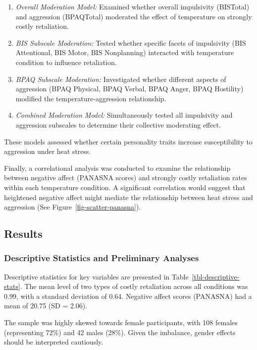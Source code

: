\documentclass[
  man,
  floatsintext,
  longtable,
  nolmodern,
  notxfonts,
  notimes,
  colorlinks=true,linkcolor=blue,citecolor=blue,urlcolor=blue]{apa7}
\providecommand{\tightlist}{%
  \setlength{\itemsep}{0pt}\setlength{\parskip}{0pt}}
\begin{document}
\begin{enumerate}
\def\labelenumi{\arabic{enumi}.}
\tightlist
\item
  \emph{Overall Moderation Model:} Examined whether overall impulsivity
  (BISTotal) and aggression (BPAQTotal) moderated the effect of
  temperature on strongly costly retaliation.
\item
  \emph{BIS Subscale Moderation:} Tested whether specific facets of
  impulsivity (BIS Attentional, BIS Motor, BIS Nonplanning) interacted
  with temperature condition to influence retaliation.
\item
  \emph{BPAQ Subscale Moderation:} Investigated whether different
  aspects of aggression (BPAQ Physical, BPAQ Verbal, BPAQ Anger, BPAQ
  Hostility) modified the temperature-aggression relationship.
\item
  \emph{Combined Moderation Model:} Simultaneously tested all
  impulsivity and aggression subscales to determine their collective
  moderating effect.
\end{enumerate}

These models assessed whether certain personality traits increase
susceptibility to aggression under heat stress.

Finally, a correlational analysis was conducted to examine the
relationship between negative affect (PANASNA scores) and strongly
costly retaliation rates within each temperature condition. A
significant correlation would suggest that heightened negative affect
might mediate the relationship between heat stress and aggression (See
Figure~\ref{fig-scatter-panasna}).

\subsection{Results}\label{results}

\subsubsection{Descriptive Statistics and Preliminary
Analyses}\label{descriptive-statistics-and-preliminary-analyses}

Descriptive statistics for key variables are presented in
Table~\ref{tbl-descriptive-stats}. The mean level of two types of costly
retaliation across all conditions was 0.99, with a standard deviation of
0.64. Negative affect scores (PANASNA) had a mean of 20.75 (SD = 2.06).

The sample was highly skewed towards female participants, with 108
females (representing 72\%) and 42 males (28\%). Given the imbalance,
gender effects should be interpreted cautiously.
\end{document}
